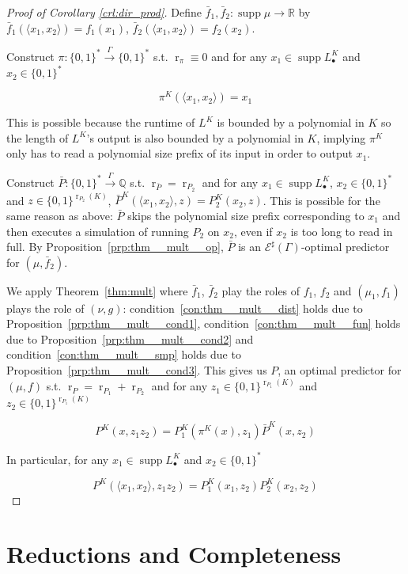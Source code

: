 \documentclass{article}
\numberwithin{equation}{section}
\theoremstyle{definition}
\theoremstyle{plain}
\newcommand{\Bool}{\{0,1\}}
\newcommand{\Words}{{\Bool^*}}
\DeclareMathOperator{\Supp}{supp}
\DeclareMathOperator{\R}{r}
\newcommand{\Rats}{\mathbb{Q}}
\newcommand{\Reals}{\mathbb{R}}
\newcommand{\Chev}[1]{\langle #1 \rangle}
\newcommand{\Fall}{\mathcal{E}}
\newcommand{\ESG}{\Fall^\sharp(\Gamma)}
\newcommand{\Scheme}{\xrightarrow{\Gamma}}
\begin{document}
\begin{proof}[Proof of Corollary \ref{crl:dir_prod}]

Define $\bar{f}_1, \bar{f}_2: \Supp \mu \rightarrow \Reals$ by $\bar{f}_1(\Chev{x_1,x_2})=f_1(x_1)$, $\bar{f}_2(\Chev{x_1,x_2})=f_2(x_2)$. 

Construct $\pi: \Words \Scheme \Words$ s.t. $\R_\pi \equiv 0$ and for any ${x_1 \in \Supp L_\bullet^K}$ and $x_2 \in \Words$ 

\[\pi^K(\Chev{x_1,x_2})=x_1\]

This is possible because the runtime of $L^K$ is bounded by a polynomial in $K$ so the length of $L^K$'s output is also bounded by a polynomial in $K$, implying $\pi^K$ only has to read a polynomial size prefix of its input in order to output $x_1$.

Construct $\bar{P}: \Words \Scheme \Rats$ s.t. $\R_{\bar{P}}=\R_{P_2}$ and for any $x_1 \in \Supp L_\bullet^K$, $x_2 \in \Words$ and $z \in \Bool^{\R_{P_2}(K)}$, $\bar{P}^K(\Chev{x_1,x_2},z)=P_2^K(x_2,z)$. This is possible for the same reason as above: $\bar{P}$ skips the polynomial size prefix corresponding to $x_1$ and then executes a simulation of running $P_2$ on $x_2$, even if $x_2$ is too long to read in full. By Proposition~\ref{prp:thm__mult__op}, $\bar{P}$ is an $\ESG$-optimal predictor for $(\mu,\bar{f}_2)$. 

We apply Theorem~\ref{thm:mult} where $\bar{f}_1$, $\bar{f}_2$ play the roles of $f_1$, $f_2$ and $(\mu_1, f_1)$ plays the role of $(\nu,g)$: condition~\ref{con:thm__mult__dist} holds due to Proposition~\ref{prp:thm__mult__cond1}, condition~\ref{con:thm__mult__fun} holds due to Proposition~\ref{prp:thm__mult__cond2} and condition~\ref{con:thm__mult__smp} holds due to Proposition~\ref{prp:thm__mult__cond3}. This gives us $P$, an optimal predictor for $(\mu, f)$ s.t. ${\R_P=\R_{P_1}+\R_{P_2}}$ and for any ${z_1 \in \Bool^{\R_{P_1}(K)}}$ and $z_2 \in \Bool^{\R_{P_1}(K)}$ 

\[P^K(x, z_1 z_2) = P_1^K(\pi^K(x),z_1) \bar{P}^K(x,z_2)\]

In particular, for any ${x_1 \in \Supp L_\bullet^K}$ and $x_2 \in \Words$

\[P^K(\Chev{x_1,x_2}, z_1 z_2)=P_1^K(x_1,z_2)P_2^K(x_2,z_2)\]
%
\end{proof}

\section{Reductions and Completeness}
\label{sec:reductions}
\end{document}
